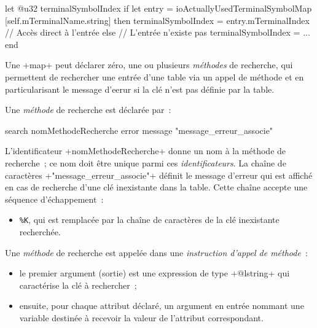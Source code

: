\begin{galgas4}
let @u32 terminalSymbolIndex
if let entry = ioActuallyUsedTerminalSymbolMap [self.mTerminalName.string] then
  terminalSymbolIndex = entry.mTerminalIndex // Accès direct à l'entrée
else // L'entrée n'existe pas
  terminalSymbolIndex = ...
end
\end{galgas4}









Une \ggsq+map+ peut déclarer zéro, une ou plusieurs \emph{méthodes} de recherche, qui permettent de rechercher une entrée d'une table via un appel de méthode et en particularisant le message d'eerur si la clé n'est pas définie par la table.


Une \emph{méthode} de recherche est déclarée par~:


\begin{galgas4}
search nomMethodeRecherche error message "message_erreur_associe"
\end{galgas4}

\begin{galgas4}
\end{galgas4}

L'identificateur \ggsq+nomMethodeRecherche+ donne un nom à la méthode de recherche~; ce nom doit être unique parmi ces \emph{identificateurs}. La chaîne de caractères \ggsq+"message_erreur_associe"+ définit le message d'erreur qui est affiché en cas de recherche d'une clé inexistante dans la table. Cette chaîne accepte une séquence d'échappement~:
\begin{itemize}
  \item \texttt{\%K}, qui est remplacée par la chaîne de caractères de la clé inexistante recherchée.
\end{itemize}


Une \emph{méthode} de recherche est appelée dans une \emph{instruction d'appel de méthode}~:
\begin{itemize}
  \item le premier argument (sortie) est une expression de type \ggsq+@lstring+ qui caractérise la clé à rechercher~;
  \item ensuite, pour chaque attribut déclaré, un argument en entrée nommant une variable destinée à recevoir la valeur de l'attribut correspondant.
\end{itemize}


